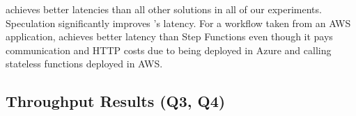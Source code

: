 %
\sys achieves better latencies than all other solutions in all of our experiments. Speculation significantly improves \sys's latency. For a workflow taken from an AWS application, \sys achieves better latency than Step Functions even though it pays communication and HTTP costs due to being deployed in Azure and calling stateless functions deployed in AWS.



\subsection{Throughput Results (Q3, Q4)}
\label{ssec:eval-throughput}


